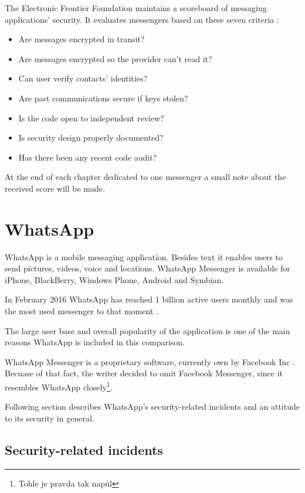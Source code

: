 \documentclass[thesis=M,english]{FITthesis}[2012/10/20]
\begin{document}
The Electronic Frontier Foundation maintains a scoreboard of messaging applications' security. It evaluates messengers based on these seven criteria \cite{eff-score}:

\begin{itemize}
	\item Are messages encrypted in transit?
	\item Are messages encrypted so the provider can’t read it?
	\item Can user verify contacts’ identities?
	\item Are past communications secure if keys stolen?
	\item Is the code open to independent review?
	\item Is security design properly documented?
	\item Has there been any recent code audit?
\end{itemize}

At the end of each chapter dedicated to one messenger a small note about the received score will be made.

\section{WhatsApp}

WhatsApp is a mobile messaging application. Besides text it enables users to send pictures, videos, voice and locations. WhatsApp Messenger is available for iPhone, BlackBerry, Windows Phone, Android and Symbian\cite{whatsapphomepage}.

In February 2016 WhatsApp has reached 1 billion active users monthly and was the most used messenger to that moment \cite{whatsappusers}.

The large user base and overall popularity of the application is one of the main reasons WhatsApp is included in this comparison.

WhatsApp Messenger is a proprietary software, currently own by Facebook Inc \cite{facebookwhatsappbuy}. Becuase of that fact, the writer decided to omit Facebook Messenger, since it resembles WhatsApp closely\footnote{Tohle je pravda tak napůl}.

Following section describes WhatsApp's security-related incidents and an attitude to its security in general.

\subsection{Security-related incidents}
\end{document}
